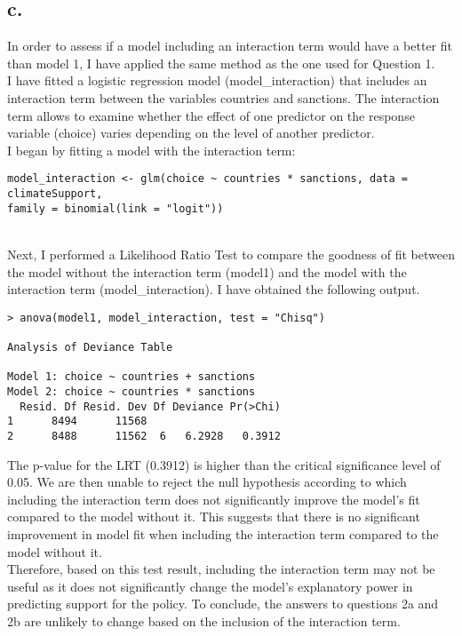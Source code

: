 \documentclass[oneside]{article}
\begin{document}
\subsection{c.}
In order to assess if a model including an interaction term would have a better fit than model 1, I have applied the same method as the one used for Question 1.
\\
I have fitted a logistic regression model (model\_interaction) that includes an interaction term between the variables countries and sanctions. The interaction term allows to examine whether the effect of one predictor on the response variable (choice) varies depending on the level of another predictor.
\\
I began by fitting a model with the interaction term:
\begin{verbatim}
model_interaction <- glm(choice ~ countries * sanctions, data = climateSupport, 
family = binomial(link = "logit"))  
\end{verbatim}
\\
Next, I performed a Likelihood Ratio Test to compare the goodness of fit between the model without the interaction term (model1) and the model with the interaction term (model\_interaction). I have obtained the following output.
\begin{verbatim}
> anova(model1, model_interaction, test = "Chisq")  

Analysis of Deviance Table

Model 1: choice ~ countries + sanctions
Model 2: choice ~ countries * sanctions
  Resid. Df Resid. Dev Df Deviance Pr(>Chi)
1      8494      11568                     
2      8488      11562  6   6.2928   0.3912
\end{verbatim}

The p-value for the LRT (0.3912) is higher than the critical significance level of 0.05. We are then unable to reject the null hypothesis according to which including the interaction term does not significantly improve the model's fit compared to the model without it. This suggests that there is no significant improvement in model fit when including the interaction term compared to the model without it.
\\
Therefore, based on this test result, including the interaction term may not be useful as it does not significantly change the model's explanatory power in predicting support for the policy. To conclude, the answers to questions 2a and 2b are unlikely to change based on the inclusion of the interaction term.

\noindent
\vspace{.3cm}
\noindent
\end{document}
